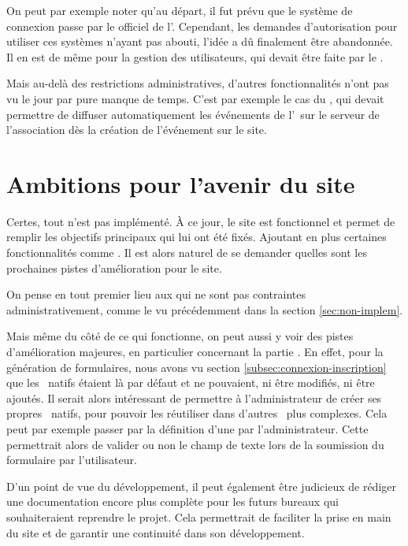 On peut par exemple noter qu'au départ, il fut prévu que le système de connexion passe par le  officiel de l'\univ. Cependant, les demandes d'autorisation pour utiliser ces systèmes n'ayant pas abouti, l'idée a dû finalement être abandonnée. Il en est de même pour la gestion des utilisateurs, qui devait être faite par le .

Mais au-delà des restrictions administratives, d'autres fonctionnalités n'ont pas vu le jour par pure manque de temps. C'est par exemple le cas du , qui devait permettre de diffuser automatiquement les événements de l'\ofni\ sur le serveur  de l'association dès la création de l'événement sur le site.

\section{Ambitions pour l'avenir du site}
\label{sec:avenir}

Certes, tout n'est pas implémenté. À ce jour, le site est fonctionnel et permet de remplir les objectifs principaux qui lui ont été fixés. Ajoutant en plus certaines fonctionnalités comme \game. Il est alors naturel de se demander quelles sont les prochaines pistes d'amélioration pour le site.
\bigskip

On pense en tout premier lieu aux  qui ne sont pas contraintes administrativement, comme le  vu précédemment dans la section \ref{sec:non-implem}.

Mais même du côté de ce qui fonctionne, on peut aussi y voir des pistes d'amélioration majeures, en particulier concernant la partie . En effet, pour la génération de formulaires, nous avons vu section \ref{subsec:connexion-inscription} que les \formwidget\ natifs étaient là par défaut et ne pouvaient, ni être modifiés, ni être ajoutés. Il serait alors intéressant de permettre à l'administrateur de créer ses propres \formwidget\ natifs, pour pouvoir les réutiliser dans d'autres \formwidget\ plus complexes. Cela peut par exemple passer par la définition d'une  par l'administrateur. Cette  permettrait alors de valider ou non le champ de texte lors de la soumission du formulaire par l'utilisateur.
\bigskip

D'un point de vue du développement, il peut également être judicieux de rédiger une documentation encore plus complète pour les futurs bureaux qui souhaiteraient reprendre le projet. Cela permettrait de faciliter la prise en main du site et de garantir une continuité dans son développement.
